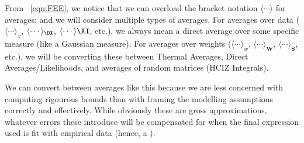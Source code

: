 From \EQN~\ref{eqn:FEE}, we notice that we can overload the bracket notation $\langle\cdots\rangle$ for averages; and we will consider multiple types of averages.
For averages over data ($\langle\cdots\rangle_{x}$, $\langle\cdots\rangle_{\DX}$, $\langle\cdots\rangle{\XI}$, etc.), we always mean a direct average over some specific measure
(like a Gaussian measure).
For averages over weights ($\langle\cdots\rangle_{w}$, $\langle\cdots\rangle_{\mathbf{W}}$, $\langle\cdots\rangle_{\mathbf{S}}$, etc.),
we will be converting these between Thermal Averages, Direct Averages/Likelihoods, and averages of random matrices (HCIZ Integrals).

We can convert between averages like this because we are less concerned with computing rigourous bounds than with framing the modelling assumptions correctly and effectively.
While obviously these are gross approximations, whatever errors these introduce will be compensated for when the final expression used is fit with empirical data (hence, a \SETOL).
